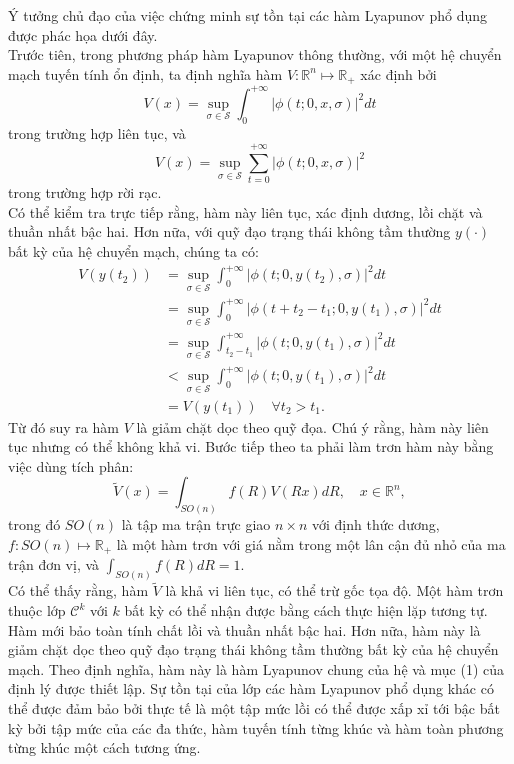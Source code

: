 \documentclass[14pt,a4paper,oneside]{report}		%
\theoremstyle{definition}
\begin{document}
Ý tưởng chủ đạo của việc chứng minh sự tồn tại các hàm Lyapunov phổ dụng được phác họa dưới đây.\\
Trước tiên, trong phương pháp hàm Lyapunov thông thường, với một hệ chuyển mạch tuyến tính ổn định, ta định nghĩa hàm $V:\mathbb{R}^n\mapsto\mathbb{R}_+$ xác định bởi
$$V(x)=\sup_{\sigma\in\mathcal{S}}\int_0^{+\infty}|\phi(t;0,x,\sigma)|^2dt$$
trong trường hợp liên tục, và
$$V(x)=\sup_{\sigma\in\mathcal{S}}\sum_{t=0}^{+\infty}|\phi(t;0,x,\sigma)|^2$$
trong trường hợp rời rạc.\\
Có thể kiểm tra trực tiếp rằng, hàm này liên tục, xác định dương, lồi chặt và thuần nhất bậc hai. Hơn nữa, với quỹ đạo trạng thái không tầm thường $y(\cdot)$ bất kỳ của hệ chuyển mạch, chúng ta có:
\begin{equation}
\begin{split}
V(y(t_2))
&= \sup_{\sigma\in\mathcal{S}}\int^{+\infty}_0|\phi(t;0,y(t_2),\sigma)|^2dt\\
&= \sup_{\sigma\in\mathcal{S}}\int^{+\infty}_0|\phi(t+t_2-t_1;0,y(t_1),\sigma)|^2dt\\
&= \sup_{\sigma\in\mathcal{S}}\int^{+\infty}_{t_2-t_1}|\phi(t;0,y(t_1),\sigma)|^2dt\\
&< \sup_{\sigma\in\mathcal{S}}\int^{+\infty}_0|\phi(t;0,y(t_1),\sigma)|^2dt\\
&= V(y(t_1))\quad\forall t_2>t_1.
\end{split}
\end{equation}
Từ đó suy ra hàm $V$ là giảm chặt dọc theo quỹ đọa. Chú ý rằng, hàm này liên tục nhưng có thể không khả vi. Bước tiếp theo ta phải làm trơn hàm này bằng việc dùng tích phân:
$$\tilde{V}(x)=\int_{SO(n)}f(R)V(Rx)dR,\quad x\in\mathbb{R}^n,$$
trong đó $SO(n)$ là tập ma trận trực giao $n\times n$ với định thức dương, $f:SO(n)\mapsto \mathbb{R}_+$ là một hàm trơn với giá nằm trong một lân cận đủ nhỏ của ma trận đơn vị, và $\int_{SO(n)}f(R)dR=1$.\\
Có thể thấy rằng, hàm $\tilde{V}$ là khả vi liên tục, có thể trừ gốc tọa độ. Một hàm trơn thuộc lớp $\mathcal{C}^k$ với $k$ bất kỳ có thể nhận được bằng cách thực hiện lặp tương tự. Hàm mới bảo toàn tính chất lồi và thuần nhất bậc hai. Hơn nữa, hàm này là giảm chặt dọc theo quỹ đạo trạng thái không tầm thường bất kỳ của hệ chuyển mạch. Theo định nghĩa, hàm này là hàm Lyapunov chung của hệ và mục (1) của định lý được thiết lập. Sự tồn tại của lớp các hàm Lyapunov phổ dụng khác có thể được đảm bảo bởi thực tế là một tập mức lồi có thể được xấp xỉ tới bậc bất kỳ bởi tập mức của các đa thức, hàm tuyến tính từng khúc và hàm toàn phương từng khúc một cách tương ứng.\\
\end{document}

